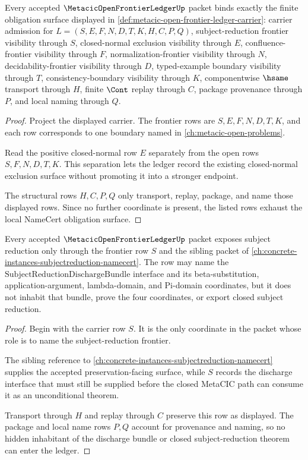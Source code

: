 \begin{theorem}
\label{thm:metacic-open-frontier-ledger-namecert-obligations}
Every accepted $\MetacicOpenFrontierLedgerUp$ packet binds exactly the finite obligation surface displayed in \autoref{def:metacic-open-frontier-ledger-carrier}: carrier admission for $L=(S,E,F,N,D,T,K,H,C,P,Q)$, subject-reduction frontier visibility through $S$, closed-normal exclusion visibility through $E$, confluence-frontier visibility through $F$, normalization-frontier visibility through $N$, decidability-frontier visibility through $D$, typed-example boundary visibility through $T$, consistency-boundary visibility through $K$, componentwise $\hsame$ transport through $H$, finite $\Cont$ replay through $C$, package provenance through $P$, and local naming through $Q$.
\end{theorem}
\begin{proof}
Project the displayed carrier. The frontier rows are $S,E,F,N,D,T,K$, and each row corresponds to one boundary named in \autoref{ch:metacic-open-problems}.

Read the positive closed-normal row $E$ separately from the open rows $S,F,N,D,T,K$. This separation lets the ledger record the existing closed-normal exclusion surface without promoting it into a stronger endpoint.

The structural rows $H,C,P,Q$ only transport, replay, package, and name those displayed rows. Since no further coordinate is present, the listed rows exhaust the local NameCert obligation surface.
\end{proof}

\begin{theorem}
\label{thm:metacic-open-frontier-ledger-subject-reduction-boundary}
Every accepted $\MetacicOpenFrontierLedgerUp$ packet exposes subject reduction only through the frontier row $S$ and the sibling packet of \autoref{ch:concrete-instances-subjectreduction-namecert}. The row may name the $\mathrm{SubjectReductionDischargeBundle}$ interface and its beta-substitution, application-argument, lambda-domain, and Pi-domain coordinates, but it does not inhabit that bundle, prove the four coordinates, or export closed subject reduction.
\end{theorem}
\begin{proof}
Begin with the carrier row $S$. It is the only coordinate in the packet whose role is to name the subject-reduction frontier.

The sibling reference to \autoref{ch:concrete-instances-subjectreduction-namecert} supplies the accepted preservation-facing surface, while $S$ records the discharge interface that must still be supplied before the closed MetaCIC path can consume it as an unconditional theorem.

Transport through $H$ and replay through $C$ preserve this row as displayed. The package and local name rows $P,Q$ account for provenance and naming, so no hidden inhabitant of the discharge bundle or closed subject-reduction theorem can enter the ledger.
\end{proof}

